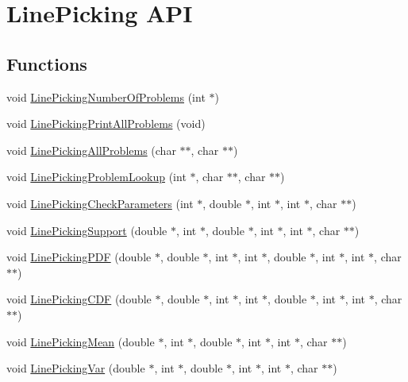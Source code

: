 \hypertarget{group__api}{\section{Line\-Picking A\-P\-I}
\label{group__api}
}
\subsection*{Functions}
\begin{DoxyCompactItemize}
\item 
void \hyperlink{group__api_gab0e3cb9eaef2a9f040f1135eee394f28}{Line\-Picking\-Number\-Of\-Problems} (int $\ast$)
\item 
void \hyperlink{group__api_ga1a1c27d3c46da382a0443f810628a8ac}{Line\-Picking\-Print\-All\-Problems} (void)
\item 
void \hyperlink{group__api_gaf04b41252ebd1a3013b6bcb4dbbf3649}{Line\-Picking\-All\-Problems} (char $\ast$$\ast$, char $\ast$$\ast$)
\item 
void \hyperlink{group__api_ga146eea4bf38bd6e3812ea47ae2ac57a7}{Line\-Picking\-Problem\-Lookup} (int $\ast$, char $\ast$$\ast$, char $\ast$$\ast$)
\item 
void \hyperlink{group__api_gac55d1d166b33c8906ceccbb37010ddb0}{Line\-Picking\-Check\-Parameters} (int $\ast$, double $\ast$, int $\ast$, int $\ast$, char $\ast$$\ast$)
\item 
void \hyperlink{group__api_ga0aec0b2f87903f4bf4ad3011a99b3446}{Line\-Picking\-Support} (double $\ast$, int $\ast$, double $\ast$, int $\ast$, int $\ast$, char $\ast$$\ast$)
\item 
void \hyperlink{group__api_ga8feba9835984bd74f3d919f51389e573}{Line\-Picking\-P\-D\-F} (double $\ast$, double $\ast$, int $\ast$, int $\ast$, double $\ast$, int $\ast$, int $\ast$, char $\ast$$\ast$)
\item 
void \hyperlink{group__api_ga445ba2c007d60d789747cecbd5f874b9}{Line\-Picking\-C\-D\-F} (double $\ast$, double $\ast$, int $\ast$, int $\ast$, double $\ast$, int $\ast$, int $\ast$, char $\ast$$\ast$)
\item 
void \hyperlink{group__api_ga39879835a11f7af8bf65699f9d83a5cb}{Line\-Picking\-Mean} (double $\ast$, int $\ast$, double $\ast$, int $\ast$, int $\ast$, char $\ast$$\ast$)
\item 
void \hyperlink{group__api_ga08fecba488534373e8d1710f273bc49c}{Line\-Picking\-Var} (double $\ast$, int $\ast$, double $\ast$, int $\ast$, int $\ast$, char $\ast$$\ast$)
\end{DoxyCompactItemize}


